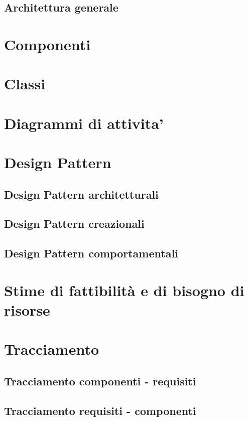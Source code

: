 \subsection{Architettura generale} %

\newpage
\section{Componenti}%

\newpage
\section{Classi}%

\newpage
\section{Diagrammi di attivita'}%

\newpage
\section{Design Pattern}%
\subsection{Design Pattern architetturali} %
\subsection{Design Pattern creazionali} %
\subsection{Design Pattern comportamentali} %

\newpage
\section{Stime di fattibilità e di bisogno di risorse}%

\newpage
\section{Tracciamento} %
\subsection{Tracciamento componenti - requisiti} %
\subsection{Tracciamento requisiti - componenti} %

